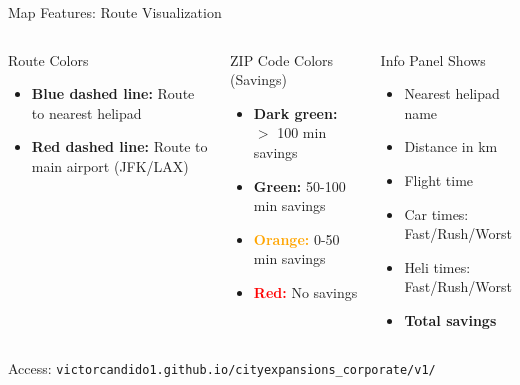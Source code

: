 \documentclass[aspectratio=169,9pt]{beamer}
\begin{document}
\begin{frame}{Map Features: Route Visualization}
\begin{columns}
\begin{exampleblock}{Route Colors}
\begin{itemize}
    \item \textcolor{revoBlue}{\textbf{Blue dashed line:}} Route to nearest helipad
    \item \textcolor{revoRed}{\textbf{Red dashed line:}} Route to main airport (JFK/LAX)
\end{itemize}
\end{exampleblock}

\begin{block}{ZIP Code Colors (Savings)}
\begin{itemize}
    \item \textcolor{green!60!black}{\textbf{Dark green:}} $>$ 100 min savings
    \item \textcolor{green!40!black}{\textbf{Green:}} 50-100 min savings
    \item \textcolor{orange}{\textbf{Orange:}} 0-50 min savings
    \item \textcolor{red}{\textbf{Red:}} No savings
\end{itemize}
\end{block}

\begin{alertblock}{Info Panel Shows}
\begin{itemize}
    \item Nearest helipad name
    \item Distance in km
    \item Flight time
    \item Car times: Fast/Rush/Worst
    \item Heli times: Fast/Rush/Worst
    \item \textbf{Total savings}
\end{itemize}
\end{alertblock}
\end{columns}

\vspace{0.5em}
\begin{center}
\footnotesize{Access: \texttt{victorcandido1.github.io/cityexpansions\_corporate/v1/}}
\end{center}
\end{frame}

\end{document}
